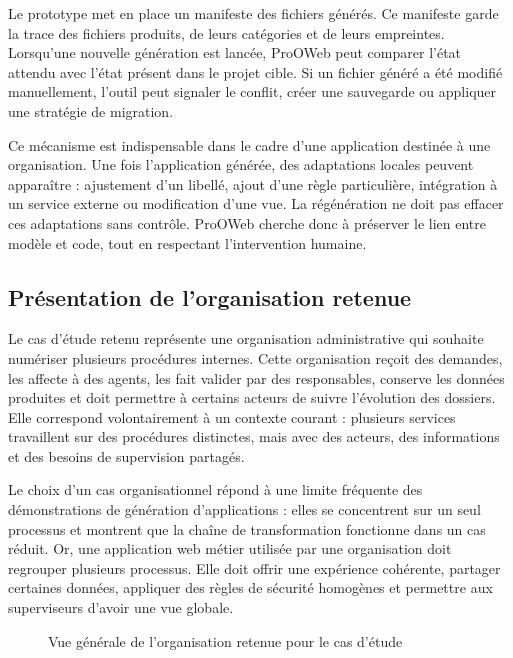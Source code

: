 Le prototype met en place un manifeste des fichiers générés. Ce manifeste garde la trace des fichiers produits, de leurs catégories et de leurs empreintes. Lorsqu'une nouvelle génération est lancée, ProOWeb peut comparer l'état attendu avec l'état présent dans le projet cible. Si un fichier généré a été modifié manuellement, l'outil peut signaler le conflit, créer une sauvegarde ou appliquer une stratégie de migration.

Ce mécanisme est indispensable dans le cadre d'une application destinée à une organisation. Une fois l'application générée, des adaptations locales peuvent apparaître : ajustement d'un libellé, ajout d'une règle particulière, intégration à un service externe ou modification d'une vue. La régénération ne doit pas effacer ces adaptations sans contrôle. ProOWeb cherche donc à préserver le lien entre modèle et code, tout en respectant l'intervention humaine.

\label{sec:chap4-cas-etude}

\subsection{Présentation de l'organisation retenue}

Le cas d'étude retenu représente une organisation administrative qui souhaite numériser plusieurs procédures internes. Cette organisation reçoit des demandes, les affecte à des agents, les fait valider par des responsables, conserve les données produites et doit permettre à certains acteurs de suivre l'évolution des dossiers. Elle correspond volontairement à un contexte courant : plusieurs services travaillent sur des procédures distinctes, mais avec des acteurs, des informations et des besoins de supervision partagés.

Le choix d'un cas organisationnel répond à une limite fréquente des démonstrations de génération d'applications : elles se concentrent sur un seul processus et montrent que la chaîne de transformation fonctionne dans un cas réduit. Or, une application web métier utilisée par une organisation doit regrouper plusieurs processus. Elle doit offrir une expérience cohérente, partager certaines données, appliquer des règles de sécurité homogènes et permettre aux superviseurs d'avoir une vue globale.

\begin{figure}[H]
\centering
{}
\caption{Vue générale de l'organisation retenue pour le cas d'étude}
\label{fig:chap4-organisation-cas-etude}
\end{figure}

